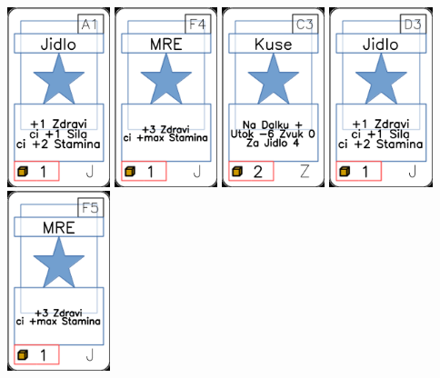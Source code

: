 \documentclass[a4paper]{article}
\begin{document}
	\includegraphics[width=3.0cm]{img-1_0}
	\includegraphics[width=3.0cm]{img-1_28}
	\includegraphics[width=3.0cm]{img-1_102}
	\includegraphics[width=3.0cm]{img-1_17}
	\includegraphics[width=3.0cm]{img-1_29}
\end{document}
